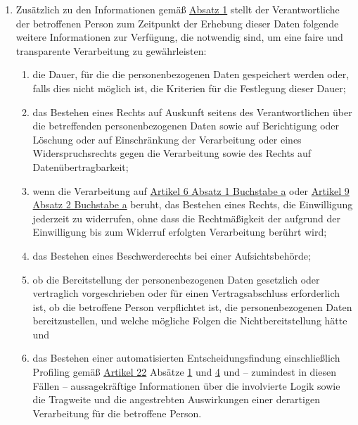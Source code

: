 \begin{enumerate}
\begin{enumerate}
  \end{enumerate}

  \item Zusätzlich zu den Informationen gemäß \hyperref[itm:13-1]{Absatz 1} stellt der Verantwortliche der betroffenen
   Person zum Zeitpunkt der Erhebung dieser Daten folgende weitere Informationen zur Verfügung, die notwendig sind, um
   eine faire und transparente Verarbeitung zu gewährleisten:
  \label{itm:13-2}

  \begin{enumerate}
  
    \item die Dauer, für die die personenbezogenen Daten gespeichert werden oder, falls dies nicht möglich ist, die
     Kriterien für die Festlegung dieser Dauer;
    \label{itm:13-2a}

    \item das Bestehen eines Rechts auf Auskunft seitens des Verantwortlichen über die betreffenden personenbezogenen
     Daten sowie auf Berichtigung oder Löschung oder auf Einschränkung der Verarbeitung oder eines Widerspruchsrechts
     gegen die Verarbeitung sowie des Rechts auf Datenübertragbarkeit;
    \label{itm:13-2b}

    \item wenn die Verarbeitung auf \hyperref[itm:06-1a]{Artikel 6 Absatz 1 Buchstabe a} oder \hyperref[itm:09-2a]
     {Artikel 9 Absatz 2 Buchstabe a} beruht, das Bestehen eines Rechts, die Einwilligung jederzeit zu widerrufen, ohne
     dass die Rechtmäßigkeit der aufgrund der Einwilligung bis zum Widerruf erfolgten Verarbeitung berührt wird;
    \label{itm:13-2c}

    \item das Bestehen eines Beschwerderechts bei einer Aufsichtsbehörde;
    \label{itm:13-2d}

    \item ob die Bereitstellung der personenbezogenen Daten gesetzlich oder vertraglich vorgeschrieben oder für einen
     Vertragsabschluss erforderlich ist, ob die betroffene Person verpflichtet ist, die personenbezogenen Daten
     bereitzustellen, und welche mögliche Folgen die Nichtbereitstellung hätte und
    \label{itm:13-2e}

    \item das Bestehen einer automatisierten Entscheidungsfindung einschließlich Profiling gemäß \hyperref[ch:22]
     {Artikel 22} Absätze \hyperref[itm:22-1]{1} und \hyperref[itm:22-4]{4} und -- zumindest in diesen Fällen --
     aussagekräftige Informationen über die involvierte Logik sowie die Tragweite und die angestrebten Auswirkungen
     einer derartigen Verarbeitung für die betroffene Person.
    \label{itm:13-2f}


\end{enumerate}
\end{enumerate}
